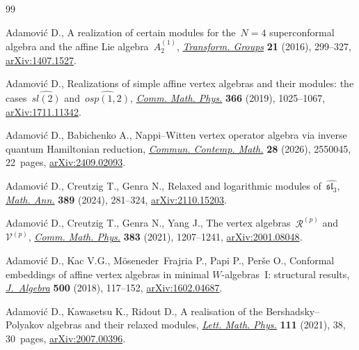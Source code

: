 \begin{thebibliography}{99}
\footnotesize\itemsep=0pt

Adamovi\'c D., A realization of certain modules for the~{$N=4$} superconformal
 algebra and the affine {L}ie algebra~{$A_2^{(1)}$},
 \href{https://doi.org/10.1007/s00031-015-9349-2}{\textit{Transform. Groups}}
 \textbf{21} (2016), 299--327,
 \href{http://arxiv.org/abs/1407.1527}{arXiv:1407.1527}.

Adamovi\'c D., Realizations of simple affine vertex algebras and their modules:
 the cases~{$\widehat{sl(2)}$} and~{$\widehat{osp(1,2)}$},
 \href{https://doi.org/10.1007/s00220-019-03328-4}{\textit{Comm. Math. Phys.}}
 \textbf{366} (2019), 1025--1067,
 \href{http://arxiv.org/abs/1711.11342}{arXiv:1711.11342}.

Adamovi\'c D., Babichenko A., Nappi--{W}itten vertex operator algebra via
 inverse quantum {H}amiltonian reduction,
 \href{https://doi.org/10.1142/S0219199725500452}{\textit{Commun. Contemp.
 Math.}} \textbf{28} (2026), 2550045, 22~pages,
 \href{http://arxiv.org/abs/2409.02093}{arXiv:2409.02093}.

Adamovi\'c D., Creutzig T., Genra N., Relaxed and logarithmic modules
 of~{$\widehat{\mathfrak{sl}_3}$},
 \href{https://doi.org/10.1007/s00208-023-02634-6}{\textit{Math. Ann.}}
 \textbf{389} (2024), 281--324,
 \href{http://arxiv.org/abs/2110.15203}{arXiv:2110.15203}.

Adamovi\'c D., Creutzig T., Genra N., Yang J., The vertex algebras~{$\mathcal
 R^{(p)}$} and~{$\mathcal V^{(p)}$},
 \href{https://doi.org/10.1007/s00220-021-03950-1}{\textit{Comm. Math. Phys.}}
 \textbf{383} (2021), 1207--1241,
 \href{http://arxiv.org/abs/2001.08048}{arXiv:2001.08048}.

Adamovi\'c D., Kac V.G., M\"oseneder~Frajria P., Papi P., Per\v{s}e O.,
 Conformal embeddings of affine vertex algebras in minimal {$W$}-algebras~{I}:
 structural results,
 \href{https://doi.org/10.1016/j.jalgebra.2016.12.005}{\textit{J.~Algebra}}
 \textbf{500} (2018), 117--152,
 \href{http://arxiv.org/abs/1602.04687}{arXiv:1602.04687}.

Adamovi\'c D., Kawasetsu K., Ridout D., A realisation of the
 {B}ershadsky--{P}olyakov algebras and their relaxed modules,
 \href{https://doi.org/10.1007/s11005-021-01378-1}{\textit{Lett. Math. Phys.}}
 \textbf{111} (2021), 38, 30~pages,
 \href{http://arxiv.org/abs/2007.00396}{arXiv:2007.00396}.


\end{thebibliography}
